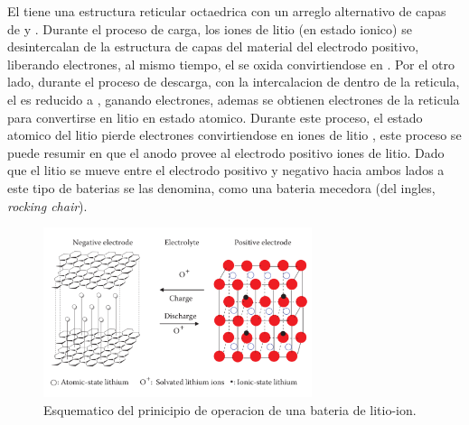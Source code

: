 \documentclass[10pt,a4paper]{article}
\begin{document}
    \noindent El  tiene una estructura reticular octaedrica con un arreglo
    alternativo de capas de  y . Durante el proceso de
    carga, los iones de litio (en estado ionico) se desintercalan de la
    estructura de capas del material del electrodo positivo, liberando electrones, 
    al mismo tiempo, el  se oxida convirtiendose en .
    Por el otro lado, durante el proceso de descarga, con la intercalacion de  dentro de 
    la reticula, el  es reducido a , ganando 
    electrones, ademas se obtienen electrones de la reticula para 
    convertirse en litio en estado atomico. Durante este proceso, el estado 
    atomico del litio pierde electrones convirtiendose en iones de litio 
    , este proceso se puede resumir en que el anodo provee al electrodo positivo 
    iones de litio. Dado que el litio se mueve entre el electrodo positivo y 
    negativo hacia ambos lados a este tipo de baterias se las denomina, como 
    una bateria mecedora (del ingles, \emph{rocking chair}).


    \begin{figure}[h!]
        \begin{center}
            \includegraphics[width=0.7\textwidth]{prin_litio}
            \caption{Esquematico del prinicipio de operacion de una bateria de
            litio-ion.}
            \label{op_lithium-ion}
        \end{center}
    \end{figure}
\end{document}
